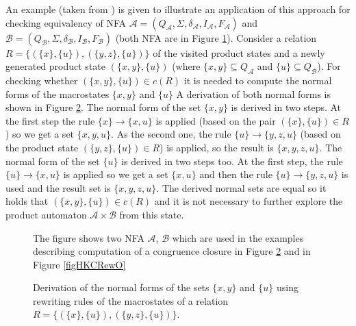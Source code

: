 An example (taken from \cite{popl13}) is given to illustrate an application of this approach for checking equivalency of 
NFA $\mathcal{A}=(Q_\mathcal{A},\Sigma,\delta_\mathcal{A},I_\mathcal{A},F_\mathcal{A})$ 
and $\mathcal{B}=(Q_\mathcal{B},\Sigma,\delta_\mathcal{B},I_\mathcal{B},F_\mathcal{B})$ (both NFA are in Figure \ref{figHKCex}). 
Consider a relation $R=\{(\{x\},\{u\}),(\{y,z\},\{u\})\}$ of the visited product states and a newly generated product state 
$(\{x,y\},\{u\})$ (where $\{x,y\}\subseteq Q_\mathcal{A}$ and 
$\{u\} \subseteq Q_\mathcal{B}$). For checking whether $(\{x,y\},\{u\})\in c(R)$ it is needed to compute the normal forms of the macrostates $\{x,y\}$ and $\{u\}$ 
A derivation of both normal forms is shown in Figure \ref{figHKCRew}. 
The normal form of the set $\{x,y\}$ is derived in two steps.
At the first step the rule $\{x\}\rightarrow\{x,u\}$ is applied (based on the pair $(\{x\},\{u\})\in R$) so we get a set $\{x,y,u\}$. As the second one, the rule 
$\{u\}\rightarrow\{y,z,u\}$ (based on the product state $(\{y,z\},\{u\})\in R$) is applied, so the result is $\{x,y,z,u\}$. The normal form of the set $\{u\}$
is derived in two steps too. At the first step, the rule $\{u\}\rightarrow\{x,u\}$ is applied so we get a set $\{x,u\}$ and then the rule 
$\{u\}\rightarrow\{y,z,u\}$ is used and the result set is $\{x,y,z,u\}$. The derived normal sets are equal so it holds that $(\{x,y\},\{u\})\in c(R)$ and
it is not necessary to further explore the product automaton $\mathcal{A}\times \mathcal{B}$ from this state.

\begin{figure}[tb]
\begin{center}
  
  
    \caption{The figure shows two NFA $\mathcal{A}$, $\mathcal{B}$ 
      which are used in the examples describing computation of a congruence closure in Figure \ref{figHKCRew} and in Figure \ref{figHKCRewO}}
		\label{figHKCex}
\end{center}
\end{figure}

\begin{figure}[bt]
  \begin{center}
    
    \caption{Derivation of the normal forms of the sets $\{x,y\}$ and $\{u\}$ using rewriting
      rules of the macrostates of a relation $R=\{(\{x\},\{u\}),(\{y,z\},\{u\})\}$.}
    \label{figHKCRew}
  \end{center}
\end{figure}


